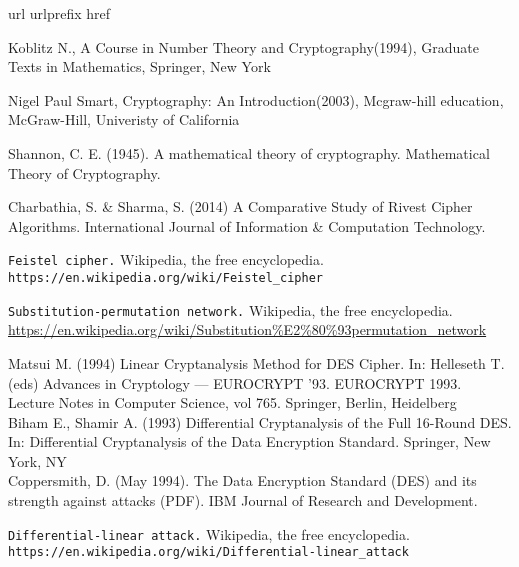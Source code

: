 \begin{thebibliography}{10}
	\expandafter\ifx\csname url\endcsname\relax
	  \def\url#1{\texttt{#1}}\fi
	\expandafter\ifx\csname urlprefix\endcsname\relax\def\urlprefix{URL }\fi
	\expandafter\ifx\csname href\endcsname\relax
	  \def\href#1#2{#2} \def\path#1{#1}\fi
	
		Koblitz N., A Course in Number Theory and Cryptography(1994), Graduate Texts in Mathematics, Springer, New York
		
		Nigel Paul Smart, Cryptography: An Introduction(2003), Mcgraw-hill education, McGraw-Hill, Univeristy of California
	
		Shannon, C. E. (1945). A mathematical theory of cryptography. Mathematical Theory of Cryptography.
	
		Charbathia, S. \& Sharma, S. (2014) A Comparative Study of Rivest Cipher Algorithms. International Journal of Information \& Computation Technology.
	
		\texttt{Feistel cipher.} Wikipedia, the free encyclopedia.\\
			\url{https://en.wikipedia.org/wiki/Feistel_cipher}
	
			\texttt{Substitution-permutation network.} Wikipedia, the free encyclopedia.\\
				\url{https://en.wikipedia.org/wiki/Substitution%E2%80%93permutation_network}
		
		Matsui M. (1994) Linear Cryptanalysis Method for DES Cipher. In: Helleseth T. (eds) Advances in Cryptology — EUROCRYPT ’93. EUROCRYPT 1993. Lecture Notes in Computer Science, vol 765. Springer, Berlin, Heidelberg\\
	
			Biham E., Shamir A. (1993) Differential Cryptanalysis of the Full 16-Round DES. In: Differential Cryptanalysis of the Data Encryption Standard. Springer, New York, NY\\
		
		Coppersmith, D. (May 1994). The Data Encryption Standard (DES) and its strength against attacks (PDF). IBM Journal of Research and Development.
	
			\texttt{Differential-linear attack.} Wikipedia, the free encyclopedia.\\
				\url{https://en.wikipedia.org/wiki/Differential-linear_attack}
	

\end{thebibliography}
